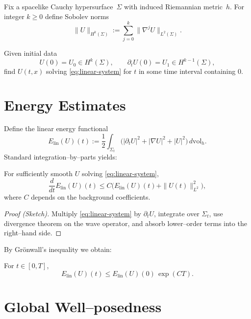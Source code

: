 Fix a spacelike Cauchy hypersurface~$\Sigma$ with induced Riemannian
metric~$h$.
For integer $k\ge0$ define Sobolev norms
\[
\|U\|_{H^{k}(\Sigma)}
 :=
 \sum_{j=0}^{k}
  \| \nabla^{j} U \|_{L^{2}(\Sigma)}.
\]

\begin{definition}
\label{def:IVP}
Given initial data
\[
U(0)=U_{0}\in H^{k}(\Sigma),\qquad
\partial_{t}U(0)=U_{1}\in H^{k-1}(\Sigma),
\]
find $U(t,x)$ solving \eqref{eq:linear-system} for $t$ in some time
interval containing $0$.
\end{definition}



\section{Energy Estimates}
\label{sec:linear-energy}

Define the linear energy functional
\begin{equation}
\label{eq:linear-energy}
E_{\mathrm{lin}}(U)(t)
:= \frac{1}{2}
\int_{\Sigma_{t}}
\bigl(
 |\partial_{t}U|^{2}
 +|\nabla U|^{2}
 + |U|^{2}
\bigr)\, d\mathrm{vol}_{h}.
\end{equation}
Standard integration--by--parts yields:

\begin{lemma}
\label{lem:linear-energy}
For sufficiently smooth $U$ solving \eqref{eq:linear-system},
\[
\frac{d}{dt}E_{\mathrm{lin}}(U)(t)
\le
C\bigl(E_{\mathrm{lin}}(U)(t)+\|U(t)\|_{L^{2}}^{2}\bigr),
\]
where $C$ depends on the background coefficients.
\end{lemma}

\begin{proof}[Proof (Sketch)]
Multiply \eqref{eq:linear-system} by $\partial_{t}U$,
integrate over $\Sigma_{t}$,
use divergence theorem on the wave operator, and absorb
lower--order terms into the right--hand side.
\end{proof}

By Grönwall's inequality we obtain:

\begin{corollary}
\label{cor:apriori}
For $t\in[0,T]$,
\[
E_{\mathrm{lin}}(U)(t)
\le
E_{\mathrm{lin}}(U)(0)\,\exp(C T).
\]
\end{corollary}



\section{Global Well--posedness}
\label{sec:global-wp}

